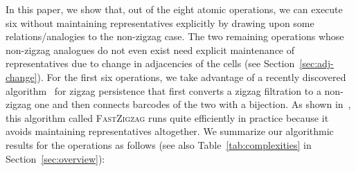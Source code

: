 \documentclass[letterpaper,11pt]{article}
\theoremstyle{mythmstyle}
\theoremstyle{mydefstyle}
\theoremstyle{plain}
\theoremstyle{definition}
\newcommand{\<}[1]{\langle #1\rangle}
\begin{document}
In this paper, we show that, out of the eight atomic operations, we can execute six without
maintaining representatives explicitly
by drawing upon some relations/analogies to the non-zigzag case.
The two remaining
operations whose non-zigzag analogues do not even exist need explicit
maintenance of representatives
due to change in adjacencies of
the cells (see Section~\ref{sec:adj-change}). For the first six operations, we take advantage
of a recently discovered algorithm~\cite{dey2022fast} 
for zigzag persistence
that first
converts a zigzag filtration to a non-zigzag one and then connects barcodes
of the two with a bijection. As shown in~\cite{dey2022fast}, this algorithm called \textsc{FastZigzag} runs quite efficiently in practice because it avoids 
maintaining representatives altogether. 
We summarize our algorithmic results for the operations as follows (see also Table~\ref{tab:complexities} in Section~\ref{sec:overview}):
\end{document}
